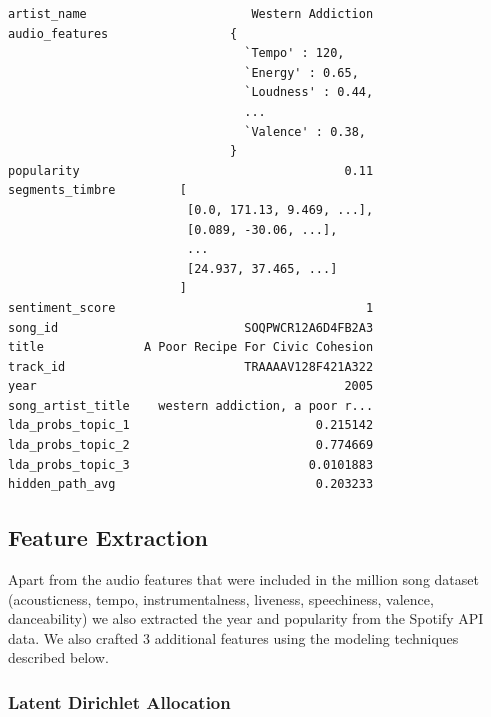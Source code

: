 \documentclass[acmtog]{acmart}
\begin{document}
\begin{verbatim}
artist_name                       Western Addiction
audio_features                 {
                                 `Tempo' : 120,
                                 `Energy' : 0.65,
                                 `Loudness' : 0.44,
                                 ...
                                 `Valence' : 0.38,
                               }
popularity                                     0.11
segments_timbre         [
                         [0.0, 171.13, 9.469, ...],
                         [0.089, -30.06, ...],
                         ...
                         [24.937, 37.465, ...]
                        ]
sentiment_score                                   1
song_id                          SOQPWCR12A6D4FB2A3
title              A Poor Recipe For Civic Cohesion
track_id                         TRAAAAV128F421A322
year                                           2005
song_artist_title    western addiction, a poor r...
lda_probs_topic_1                          0.215142
lda_probs_topic_2                          0.774669
lda_probs_topic_3                         0.0101883
hidden_path_avg                            0.203233
\end{verbatim}

\subsection{Feature Extraction}

Apart from the audio features that were included in the million song dataset (acousticness, tempo, instrumentalness, liveness, speechiness, valence, danceability) we also extracted the year and popularity from the Spotify API data. We also crafted 3 additional features using the modeling techniques described below.

\subsubsection{Latent Dirichlet Allocation}
\end{document}

